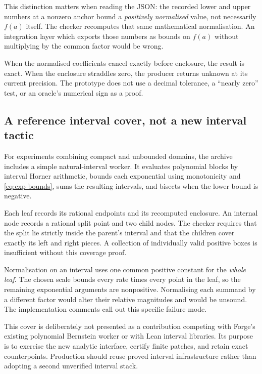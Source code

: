 This distinction matters when reading the JSON: the recorded lower and upper
numbers at a nonzero anchor bound a \emph{positively normalised} value, not
necessarily $f(a)$ itself. The checker recomputes that same mathematical
normalisation. An integration layer which exports those numbers as bounds on
$f(a)$ without multiplying by the common factor would be wrong.

When the normalised coefficients cancel exactly before enclosure, the result
is exact. When the enclosure straddles zero, the producer returns unknown at
its current precision. The prototype does not use a decimal tolerance, a
``nearly zero'' test, or an oracle's numerical sign as a proof.

\subsection{A reference interval cover, not a new interval tactic}

For experiments combining compact and unbounded domains, the archive includes
a simple natural-interval worker. It evaluates polynomial blocks by interval
Horner arithmetic, bounds each exponential using monotonicity and
\eqref{eq:exp-bounds}, sums the resulting intervals, and bisects when the lower
bound is negative.

Each leaf records its rational endpoints and its recomputed enclosure. An
internal node records a rational split point and two child nodes. The checker
requires that the split lie strictly inside the parent's interval and that the
children cover exactly its left and right pieces. A collection of individually
valid positive boxes is insufficient without this coverage proof.

Normalisation on an interval uses one common positive constant for the
\emph{whole leaf}. The chosen scale bounds every rate times every point in the
leaf, so the remaining exponential arguments are nonpositive. Normalising each
summand by a different factor would alter their relative magnitudes and would
be unsound. The implementation comments call out this specific failure mode.

This cover is deliberately not presented as a contribution competing with
Forge's existing polynomial Bernstein worker or with Lean interval libraries.
Its purpose is to exercise the new analytic interface, certify finite patches,
and retain exact counterpoints. Production should reuse proved interval
infrastructure rather than adopting a second unverified interval stack.

